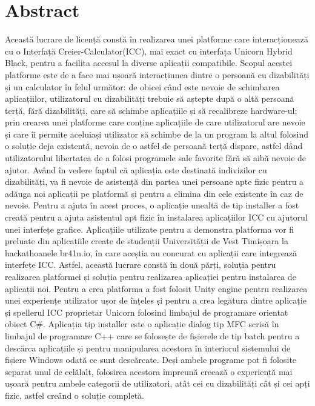 
\chapter*{Abstract}\label{cap:abstract_ro}
Această lucrare de licență constă în realizarea unei platforme care interacționează cu o Interfață Creier-Calculator(ICC), mai exact cu interfața Unicorn Hybrid Black\cite{Unicorn_Technology}, pentru a facilita accesul la diverse aplicații compatibile. Scopul acestei platforme este de a face mai ușoară interacțiunea dintre o persoană cu dizabilități și un calculator în felul următor: de obicei când este nevoie de schimbarea aplicațiilor, utilizatorul cu dizabilități trebuie să aștepte după o altă persoană terță, fără dizabilități, care să schimbe aplicațiile și să recalibreze hardware-ul; prin crearea unei platforme care conține aplicațiile de care utilizatorul are nevoie și care îi permite aceluiași utilizator să schimbe de la un program la altul folosind o soluție deja existentă\cite{Unicorn_Speller}, nevoia de o astfel de persoană terță dispare, astfel dând utilizatorului libertatea de a folosi programele sale favorite fără să aibă nevoie de ajutor.
\vspace{\baselineskip}\newline
Având în vedere faptul că aplicația este destinată indivizilor cu dizabilități, va fi nevoie de asistență din partea unei persoane apte fizic pentru a adăuga noi aplicații pe platformă și pentru a elimina din cele existente în caz de nevoie. Pentru a ajuta în acest proces, o aplicație unealtă de tip installer a fost creată pentru a ajuta asistentul apt fizic în instalarea aplicațiilor ICC cu ajutorul unei interfețe grafice. Aplicațiile utilizate pentru a demonstra platforma vor fi preluate din aplicațiile create de studenții Universității de Vest Timișoara la hackathoanele br41n.io, în care aceștia au concurat cu aplicații care integrează interfețe ICC.
\vspace{\baselineskip}\newline
Astfel, această lucrare constă în două părți, soluția pentru realizarea platformei și soluția pentru realizarea aplicației pentru instalarea de aplicații noi. Pentru a crea platforma a fost folosit Unity engine pentru realizarea unei experiențe utilizator ușor de înțeles și pentru a crea legătura dintre aplicație și spellerul ICC proprietar Unicorn\cite{Unicorn_Speller} folosind limbajul de programare orientat obiect C\#. Aplicația tip installer este o aplicație dialog tip MFC scrisă în limbajul de programare C++ care se folosește de fișierele de tip batch pentru a descărca aplicațiile și pentru manipularea acestora în interiorul sistemului de fișiere Windows odată ce sunt descărcate. Deși ambele programe pot fi folosite separat unul de celălalt, folosirea acestora împreună creează o experiență mai ușoară pentru ambele categorii de utilizatori, atât cei cu dizabilități cât și cei apți fizic, astfel creând o soluție completă.


